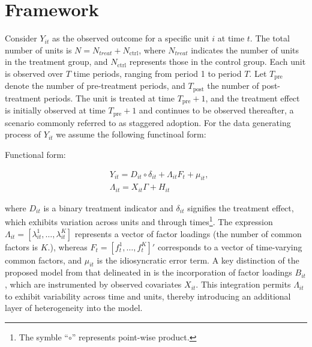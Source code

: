 \documentclass[12pt]{article}
\begin{document}
 






 
\section{Framework} 
\label{sec: framework}

Consider $Y_{it}$ as the observed outcome for a specific unit $i$ at time $t$. The total number of units is $N = N_{treat} + N_{\text{ctrl}}$, where $N_{treat}$ indicates the number of units in the treatment group, and $N_{\text{ctrl}}$ represents those in the control group. Each unit is observed over $T$ time periods, ranging from period 1 to period $T$. Let $T_{\text{pre}}$ denote the number of pre-treatment periods, and $T_{\text{post}}$ the number of post-treatment periods. The unit is treated at time $T_{\text{pre}} + 1$, and the treatment effect is initially observed at time $T_{\text{pre}} + 1$ and continues to be observed thereafter, a scenario commonly referred to as staggered adoption. For the data generating process of $Y_{it}$ we assume the following functinoal form:

\begin{assumption}
Functional form:
\label{ass: function}
\end{assumption}

\begin{equation}
\begin{aligned}
& Y_{it} = D_{it} \circ \delta_{it} + \Lambda_{it}F_{t} + \mu_{it}, \\
& \Lambda_{it} = X_{it}\Gamma + H_{it}
\end{aligned}
\label{eqn: functional form}
\end{equation}

\noindent where $D_{it}$ is a binary treatment indicator and $\delta_{it}$ signifies the treatment effect, which exhibits variation across units and through times\footnote{The symble ``$\circ$'' represents point-wise product.}. The expression $\Lambda_{it} = [\lambda_{it}^1, \ldots, \lambda_{it}^K]$ represents a vector of factor loadings (the number of common factors is $K$.), whereas $F_{t} = [f_{t}^1, \ldots, f_{t}^K]'$ corresponds to a vector of time-varying common factors, and $\mu_{it}$ is the idiosyncratic error term. A key distinction of the proposed model from that delineated in \cite{xu2017generalized} is the incorporation of factor loadings $B_{it}$, which are instrumented by observed covariates $X_{it}$. This integration permits $\Lambda_{it}$ to exhibit variability across time and units, thereby introducing an additional layer of heterogeneity into the model.
\end{document}
